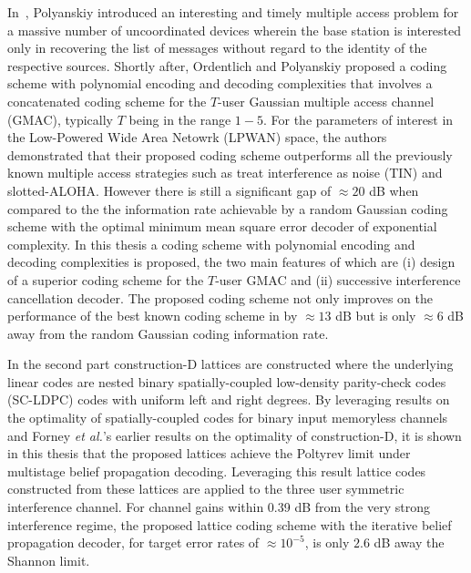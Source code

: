 	\indent In~\cite{polyanskiy2017perspective}, Polyanskiy introduced an interesting and timely multiple access problem for a massive number of uncoordinated devices wherein the base station is interested only in recovering the list of messages without regard to the identity of the respective sources. Shortly after, Ordentlich and Polyanskiy\cite{ordentlich2017low} proposed a coding scheme with polynomial encoding and decoding complexities that involves a concatenated coding scheme for the $T$-user Gaussian multiple access channel (GMAC), typically $T$ being in the range $1-5$. For the parameters of interest in the Low-Powered Wide Area Netowrk (LPWAN) space, the authors \cite{ordentlich2017low} demonstrated that their proposed coding scheme outperforms all the previously known multiple access strategies such as treat interference as noise (TIN) and slotted-ALOHA. However there is still a significant gap of $\approx 20$ dB when compared to the the information rate achievable by a random Gaussian coding scheme with the optimal minimum mean square error decoder of exponential complexity. In this thesis a coding scheme with polynomial encoding and decoding complexities is proposed, the two main features of which are (i) design of a superior coding scheme for the $T$-user GMAC and (ii) successive interference cancellation decoder. The proposed coding scheme not only improves on the performance of the best known coding scheme in \cite{ordentlich2017low} by $\approx 13$ dB but is only $\approx 6$ dB away from the random Gaussian coding information rate.

\indent In the second part construction-D lattices are constructed where the underlying linear codes are nested binary spatially-coupled low-density parity-check codes (SC-LDPC) codes with uniform left and right degrees. By leveraging results on the optimality of spatially-coupled codes for binary input memoryless channels and Forney {\em et al.}'s earlier results on the optimality of construction-D, it is shown in this thesis that the proposed lattices achieve the Poltyrev limit under multistage belief propagation decoding. Leveraging this result lattice codes constructed from these lattices are applied to the three user symmetric interference channel. For channel gains within 0.39 dB from the very strong interference regime, the proposed lattice coding scheme with the iterative belief propagation decoder, for target error rates of $\approx 10^{-5}$, is only $2.6$ dB away the Shannon limit.

